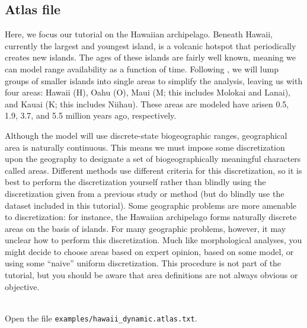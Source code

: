 \subsection{Atlas file}

Here, we focus our tutorial on the Hawaiian archipelago.
Beneath Hawaii, currently the largest and youngest island, is a volcanic hotspot that periodically creates new islands.
The ages of these islands are fairly well known, meaning we can model range availability as a function of time.
Following \citet{ree08}, we will lump groups of smaller islands into single areas to simplify the analysis, leaving us with four areas: Hawaii (H), Oahu (O), Maui (M; this includes Molokai and Lanai), and Kauai (K; this includes Niihau).
These areas are modeled have arisen 0.5, 1.9, 3.7, and 5.5 million years ago, respectively.

Although the model will use discrete-state biogeographic ranges, geographical area is naturally continuous.
This means we must impose some discretization upon the geography to designate a set of biogeographically meaningful characters called areas.
Different methods use different criteria for this discretization, so it is best to perform the discretization yourself rather than blindly using the discretization given from a previous study or method (but do blindly use the dataset included in this tutorial).
Some geographic problems are more amenable to discretization: for instance, the Hawaiian archipelago forms naturally discrete areas on the basis of islands.
For many geographic problems, however, it may unclear how to perform this discretization.
Much like morphological analyses, you might decide to choose areas based on expert opinion, based on some model, or using some ``naive'' uniform discretization.
This procedure is not part of the tutorial, but you should be aware that area definitions are not always obvious or objective.


\newpage

\noindent \\ \impmark  Open the file \texttt{examples/hawaii\_dynamic.atlas.txt}.

